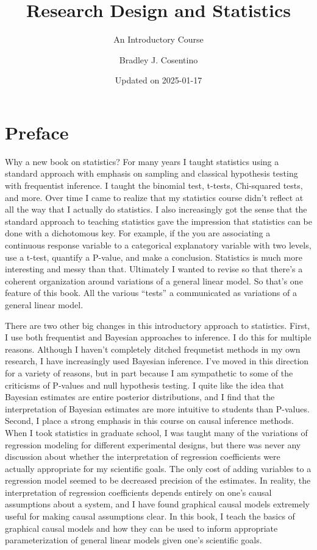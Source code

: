 \documentclass[
]{book}
\title{Research Design and Statistics}
\subtitle{An Introductory Course}
\author{Bradley J. Cosentino}
\date{Updated on 2025-01-17}
\begin{document}
\maketitle

{
\setcounter{tocdepth}{1}
\tableofcontents
}
\chapter*{Preface}\label{preface}

Why a new book on statistics? For many years I taught statistics using a standard approach with emphasis on sampling and classical hypothesis testing with frequentist inference. I taught the binomial test, t-tests, Chi-squared tests, and more. Over time I came to realize that my statistics course didn't reflect at all the way that I actually do statistics. I also increasingly got the sense that the standard approach to teaching statistics gave the impression that statistics can be done with a dichotomous key. For example, if the you are associating a continuous response variable to a categorical explanatory variable with two levels, use a t-test, quantify a P-value, and make a conclusion. Statistics is much more interesting and messy than that. Ultimately I wanted to revise so that there's a coherent organization around variations of a general linear model. So that's one feature of this book. All the various ``tests'' a communicated as variations of a general linear model.

There are two other big changes in this introductory approach to statistics. First, I use both frequentist and Bayesian approaches to inference. I do this for multiple reasons. Although I haven't completely ditched frequnetist methods in my own research, I have increasingly used Bayesian inference. I've moved in this direction for a variety of reasons, but in part because I am sympathetic to some of the criticisms of P-values and null hypothesis testing. I quite like the idea that Bayesian estimates are entire posterior distributions, and I find that the interpretation of Bayesian estimates are more intuitive to students than P-values. Second, I place a strong emphasis in this course on causal inference methods. When I took statistics in graduate school, I was taught many of the variations of regression modeling for different experimental designs, but there was never any discussion about whether the interpretation of regression coefficients were actually appropriate for my scientific goals. The only cost of adding variables to a regression model seemed to be decreased precision of the estimates. In reality, the interpretation of regression coefficients depends entirely on one's causal assumptions about a system, and I have found graphical causal models extremely useful for making causal assumptions clear. In this book, I teach the basics of graphical causal models and how they can be used to inform appropriate parameterization of general linear models given one's scientific goals.
\end{document}

